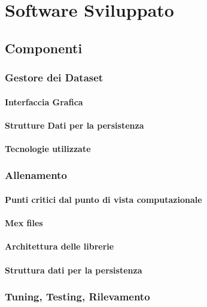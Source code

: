 
\chapter{Software Sviluppato}
\label{chap:software}
    \section{Componenti}
        \subsection{Gestore dei Dataset} %
        \label{sub:training_set_creator}
            \subsubsection{Interfaccia Grafica}
            \subsubsection{Strutture Dati per la persistenza}
            \subsubsection{Tecnologie utilizzate}        
        
        \subsection{Allenamento}
            \subsubsection{Punti critici dal punto di vista computazionale}
            \subsubsection{Mex files}
            \subsubsection{Architettura delle librerie}
            \subsubsection{Struttura dati per la persistenza}
        \subsection{Tuning, Testing, Rilevamento}
